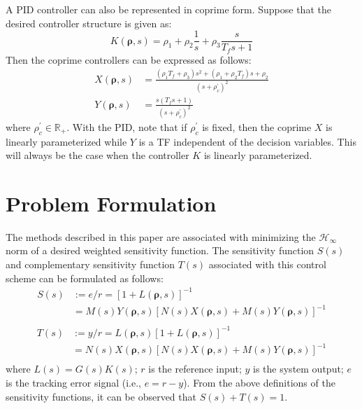 \documentclass[letterpaper, 10 pt, conference]{ieeeconf}  %
\begin{document}
A PID controller can also be represented in coprime form. Suppose that the desired controller structure is given as:
\begin{equation} \label{eq:pid}
K(\bm{\rho},s)=\rho_1 + \rho_2 \frac{1}{s} + \rho_3 \frac{s}{T_fs+1}
\end{equation}
Then the coprime controllers can be expressed as follows:
\begin{equation}
\begin{aligned} \label{eq:pid_2}
X(\bm{\rho},s) &= \frac{(\rho_1 T_f+\rho_3)s^2 + (\rho_1+\rho_2 T_f)s + \rho_2}{(s+\rho_c^{\prime})^2}\\
Y(\bm{\rho},s) &= \frac{s(T_fs+1)}{(s+\rho_c^{\prime})^2}
\end{aligned}
\end{equation}
where $\rho_c^{\prime} \in \mathbb{R}_+$. With the PID, note that if $\rho_c^{\prime}$ is fixed, then the coprime $X$ is linearly parameterized while $Y$ is a TF independent of the decision variables. This will always be the case when the controller $K$ is linearly parameterized.
\section{Problem Formulation} \label{sec:problem_form}
The methods described in this paper are associated with minimizing the $\mathcal{H}_{\infty}$ norm of a desired weighted sensitivity function. The sensitivity function $S(s)$ and complementary sensitivity function $T(s)$ associated with this control scheme can be formulated as follows:
\begin{equation}
\begin{aligned} \label{eq:S}
S(s) &:= e/r =[1+L(\bm{\rho},s)]^{-1} \\ &=  M(s)Y(\bm{\rho},s)[N(s)X(\bm{\rho},s)+M(s)Y(\bm{\rho},s)]^{-1}\\
\end{aligned}
\end{equation}
\begin{equation}
\begin{aligned} \label{eq:T}
T(s) &:= y/r =L(\bm{\rho},s)[1+L(\bm{\rho},s)]^{-1} \\ &=  N(s)X(\bm{\rho},s)[N(s)X(\bm{\rho},s)+M(s)Y(\bm{\rho},s)]^{-1}\\
\end{aligned}
\end{equation}
where $L(s) = G(s)K(s)$; $r$ is the reference input; $y$ is the system output; $e$ is the tracking error signal (i.e., $e = r-y$). From the above definitions of the sensitivity functions, it can be observed that $S(s)+T(s)=1$.
\end{document}
